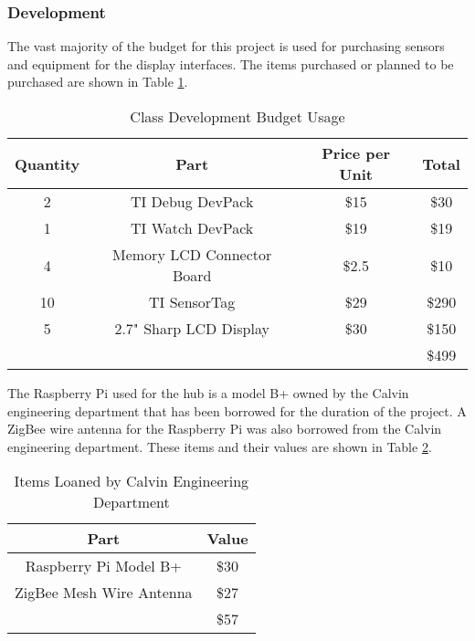 \documentclass[PPFS.tex]{template/subfiles}
\begin{document}
        \subsubsection{Development}
        The vast majority of the budget for this project is used for purchasing sensors and equipment for the display interfaces. The items purchased or planned to be purchased are shown in Table \ref{tab:devPartCost}.
        \begin{table}[H]
        	\begin{center}
        		\caption{Class Development Budget Usage}
        		\label{tab:devPartCost}
        		\begin{tabular}{|c|c|c|c|}
        			\hline
        			Quantity & Part & Price per Unit & Total\\
        			\hline
        			2 & TI Debug DevPack & \$15 & \$30\\
        			\hline
        			1 & TI Watch DevPack & \$19 & \$19\\
        			\hline
        			4 & Memory LCD Connector Board & \$2.5 & \$10\\
        			\hline
        			10 & TI SensorTag & \$29 & \$290\\
        			\hline
        			5 & 2.7" Sharp LCD Display & \$30 & \$150\\
        			\hline
        			&&& \$499\\
        			\hline
        		\end{tabular}
        	\end{center}
        \end{table}
        
        The Raspberry Pi used for the hub is a model B+ owned by the Calvin engineering department that has been borrowed for the duration of the project. A ZigBee wire antenna for the Raspberry Pi was also borrowed from the Calvin engineering department. These items and their values are shown in Table \ref{tab:devLoanedItems}.
        
        \begin{table}[H]
        	\begin{center}
        		\caption{Items Loaned by Calvin Engineering Department}
        		\label{tab:devLoanedItems}
        		\begin{tabular}{|c|c|}
        			\hline
        			Part & Value\\
        			\hline
        			Raspberry Pi Model B+ & \$30 \\
        			\hline
        			ZigBee Mesh Wire Antenna & \$27 \\
        			\hline
        			& \$57\\
        			\hline
        		\end{tabular}
        	\end{center}
        \end{table}
\end{document}
